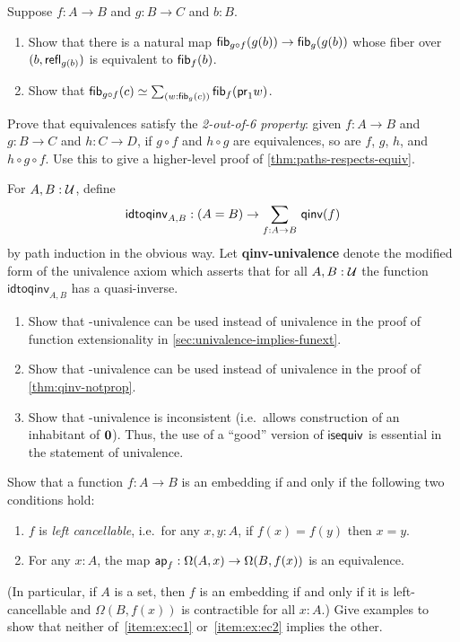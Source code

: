 \documentclass[hott-all.tex]{subfiles}
\begin{document}
\begin{ex}\label{ex:unstable-octahedron}
  Suppose $f:A\to B$ and $g:B\to C$ and $b:B$.
  \begin{enumerate}
  \item Show that there is a natural map ${\mathsf{fib}}_{g\circ f}(g(b)) \to {\mathsf{fib}}_{g}(g(b))$ whose fiber over $(b,\mathsf{refl}_{g(b)})$ is equivalent to ${\mathsf{fib}}_{f}(b)$.
  \item Show that $\eqv{\hfib{g\circ f}{c}}{\sm{w:\hfib{g}{c}} \hfib f {\proj1 w}}$.
  \end{enumerate}
\end{ex}

\begin{ex}\label{ex:2-out-of-6}
  Prove that equivalences satisfy the \emph{2-out-of-6 property}: given $f:A\to B$ and $g:B\to C$ and $h:C\to D$, if $g\circ f$ and $h\circ g$ are equivalences, so are $f$, $g$, $h$, and $h\circ g\circ f$.
  Use this to give a higher-level proof of \cref{thm:paths-respects-equiv}.
\end{ex}

\begin{ex}\label{ex:qinv-univalence}
  For $A,B:\mathcal{U}$, define
  \[ \mathsf{idtoqinv}_{A,B} :(A=B) \to \sm{f:A\to B}\qinv(f) \]
  by path induction in the obvious way.
  Let \textbf{\textsf{qinv}-univalence} denote the modified form of the univalence axiom which asserts that for all $A,B:\mathcal{U}$ the function $\mathsf{idtoqinv}_{A,B}$ has a quasi-inverse.
  \begin{enumerate}
  \item Show that \qinv-univalence can be used instead of univalence in the proof of function extensionality in \cref{sec:univalence-implies-funext}.
  \item Show that \qinv-univalence can be used instead of univalence in the proof of \cref{thm:qinv-notprop}.
  \item Show that \qinv-univalence is inconsistent (i.e.\ allows construction of an inhabitant of $\mathbf{0}$).
    Thus, the use of a ``good'' version of $\mathsf{isequiv}$ is essential in the statement of univalence.
  \end{enumerate}
\end{ex}

\begin{ex}\label{ex:embedding-cancellable}
  Show that a function $f:A\to B$ is an embedding if and only if the following two conditions hold:
  \begin{enumerate}
  \item $f$ is \emph{left cancellable}, i.e.\ for any $x,y:A$, if $f(x)=f(y)$ then $x=y$.\label{item:ex:ec1}
  \item For any $x:A$, the map $\mathsf{ap}_{f}: \Omega(A,x) \to \Omega(B,f(x))$ is an equivalence.\label{item:ex:ec2}
  \end{enumerate}
  (In particular, if $A$ is a set, then $f$ is an embedding if and only if it is left-cancellable and $\Omega(B,f(x))$ is contractible for all $x:A$.)
  Give examples to show that neither of~\ref{item:ex:ec1} or~\ref{item:ex:ec2} implies the other.
\end{ex}
\end{document}
